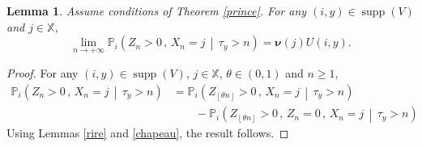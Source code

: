 \documentclass[12pt]{amsart}
\newtheorem{lemma}[theorem]{Lemma}
\theoremstyle{definition}
\numberwithin{equation}{section}
\newcommand*{\pent}[1]{\left\lfloor#1\right\rfloor}
\newcommand*{\sachant}[2]{\left.#1 \,\middle|\,#2\right.}
\def\bb#1{\mathbb{#1}}
\def\bs#1{\boldsymbol{#1}}
\def\geq{\geqslant}
\DeclareMathOperator{\supp}{supp}
\begin{document}
\begin{lemma}
Assume conditions of Theorem \ref{prince}.
\label{trompette}
For any $(i,y) \in \supp (V)$ and $j \in \bb X$,
\[
\lim_{n\to+\infty} \bb P_i \left( \sachant{ Z_n > 0 \,,\, X_n = j }{ \tau_y > n } \right) = \bs \nu(j) U(i,y).
\]
\end{lemma}

\begin{proof}
For any $(i,y) \in \supp (V)$, $j \in \bb X$, $\theta \in (0,1)$ and $n \geq 1$,
\begin{align*}
	\bb P_i \left( \sachant{ Z_n > 0 \,,\, X_n = j }{ \tau_y > n } \right) &= \bb P_i \left( \sachant{ Z_{\pent{\theta n}} > 0 \,,\, X_n = j }{ \tau_y > n } \right) \\
	&\qquad -  \bb P_i \left( \sachant{ Z_{\pent{\theta n}} > 0 \,,\, Z_n = 0 \,,\, X_n = j }{ \tau_y > n } \right)
\end{align*}
Using Lemmas \ref{rire} and \ref{chapeau}, the result follows.
\end{proof}
\end{document}
